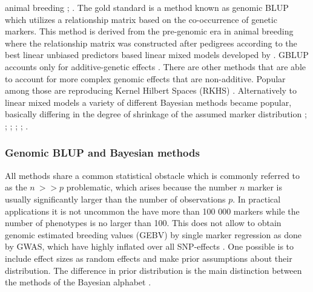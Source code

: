 animal breeding \cite{hayes2010genome}; \cite{goddard2011using}. The gold standard is a method known as
genomic BLUP \cite{vanraden2008efficient} which utilizes a relationship matrix based on the co-occurrence of
genetic markers. This method is derived from the pre-genomic era in animal breeding where the relationship
matrix was constructed after pedigrees according to the best linear unbiased predictors based linear mixed
models developed by \cite{henderson1975best}. GBLUP accounts only for additive-genetic effects
\cite{vanraden2008efficient}. There are other methods that are able to account for more complex genomic
effects that are non-additive. Popular among those are reproducing Kernel Hilbert Spaces (RKHS)
\cite{gianola2008reproducing}. Alternatively to linear mixed models a variety of different Bayesian methods
became popular, basically differing in the degree of shrinkage of the assumed marker distribution \cite{hayes2001}; \cite{gianola2009}; \cite{habier2011}; \cite{gianola2013}; \cite{crossa2017}; \cite{azodi2019}.

\subsubsection{Genomic BLUP and Bayesian methods}

All methods share a common statistical obstacle which is commonly referred to as the $n\ >> p$ problematic,
which arises because the number $n$ marker is usually significantly larger than the number of observations
$p$. In practical applications it is not uncommon the have more than 100 000 markers while the number of
phenotypes is no larger than 100. This does not allow to obtain genomic estimated breeding values (GEBV) by
single marker regression as done by GWAS, which have highly inflated over all SNP-effects
\cite{korte2013advantages}. One possible is to include effect sizes as random effects and make prior
assumptions about their distribution. The difference in prior distribution is the main distinction between the
methods of the Bayesian alphabet
\cite{gianola2013}.\\

